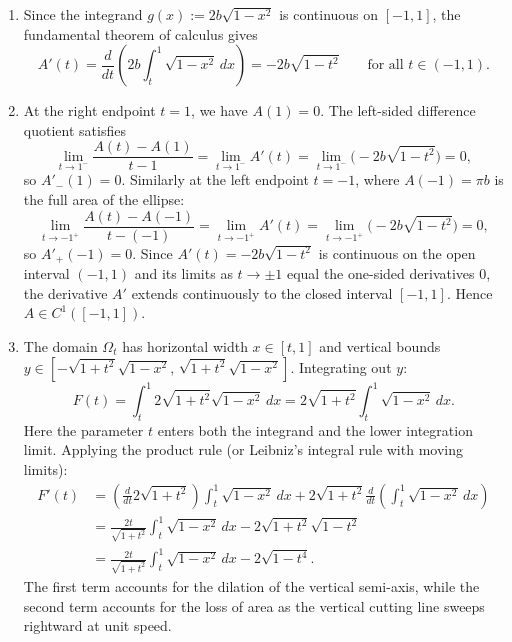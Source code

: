 \begin{exercisesolution}
\begin{enumerate}[label=\textbf{(\alph*)}]
  \item Since the integrand $g(x) := 2b\sqrt{1-x^2}$ is continuous on $[-1, 1]$, the fundamental
    theorem of calculus gives
    \[A'(t) = \frac{d}{dt}\left(2b\int_t^1 \sqrt{1-x^2}\,dx\right) = -2b\sqrt{1-t^2} \qquad \text{for all } t \in (-1, 1).\]

  \item At the right endpoint $t = 1$, we have $A(1) = 0$. The left-sided difference quotient satisfies
    \[\lim_{t \to 1^-} \frac{A(t) - A(1)}{t - 1} = \lim_{t \to 1^-} A'(t) = \lim_{t \to 1^-} \big(-2b\sqrt{1-t^2}\big) = 0,\]
    so $A'_-(1) = 0$. Similarly at the left endpoint $t = -1$, where $A(-1) = \pi b$ is the full area of the ellipse:
    \[\lim_{t \to -1^+} \frac{A(t) - A(-1)}{t - (-1)} = \lim_{t \to -1^+} A'(t) = \lim_{t \to -1^+} \big(-2b\sqrt{1-t^2}\big) = 0,\]
    so $A'_+(-1) = 0$.
    Since $A'(t) = -2b\sqrt{1-t^2}$ is continuous on the open interval $(-1, 1)$ and its limits as
    $t \to \pm 1$ equal the one-sided derivatives $0$, the derivative $A'$ extends continuously to
    the closed interval $[-1, 1]$. Hence $A \in C^1([-1, 1])$.

  \item The domain $\Omega_t$ has horizontal width $x \in [t, 1]$ and vertical bounds
    $y \in [-\sqrt{1+t^2}\sqrt{1-x^2},\, \sqrt{1+t^2}\sqrt{1-x^2}]$. Integrating out $y$:
    \[F(t) = \int_t^1 2\sqrt{1+t^2}\sqrt{1-x^2}\,dx = 2\sqrt{1+t^2} \int_t^1 \sqrt{1-x^2}\,dx.\]
    Here the parameter $t$ enters both the integrand and the lower integration limit. Applying the
    product rule (or Leibniz's integral rule with moving limits):
    \begin{align*}
      F'(t) &= \left(\frac{d}{dt} 2\sqrt{1+t^2}\right) \int_t^1 \sqrt{1-x^2}\,dx + 2\sqrt{1+t^2} \frac{d}{dt}\left(\int_t^1 \sqrt{1-x^2}\,dx\right) \\
      &= \frac{2t}{\sqrt{1+t^2}} \int_t^1 \sqrt{1-x^2}\,dx - 2\sqrt{1+t^2}\sqrt{1-t^2} \\
      &= \frac{2t}{\sqrt{1+t^2}} \int_t^1 \sqrt{1-x^2}\,dx - 2\sqrt{1-t^4}.
    \end{align*}
    The first term accounts for the dilation of the vertical semi-axis, while the second term accounts
    for the loss of area as the vertical cutting line sweeps rightward at unit speed.
\end{enumerate}
\end{exercisesolution}


